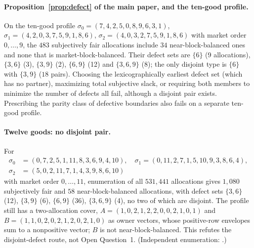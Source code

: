 \documentclass[11pt]{article}
\theoremstyle{definition}
\begin{document}
\paragraph{Proposition~\ref{prop:defect} of the main paper, and the ten-good profile.}
On the ten-good profile $\sigma_0=(7,4,2,5,0,8,9,6,3,1)$, $\sigma_1=(4,2,0,3,7,5,9,1,8,6)$, $\sigma_2=(4,0,3,2,7,5,9,1,8,6)$ with market order $0,\dots,9$, the $483$ subjectively fair allocations include $34$ near-block-balanced ones and none that is market-block-balanced. Their defect sets are $\{6\}$ (9 allocations), $\{3,6\}$ (3), $\{3,9\}$ (2), $\{6,9\}$ (12) and $\{3,6,9\}$ (8); the only disjoint type is $\{6\}$ with $\{3,9\}$ ($18$ pairs). Choosing the lexicographically earliest defect set (which has no partner), maximizing total subjective slack, or requiring both members to minimize the number of defects all fail, although a disjoint pair exists. Prescribing the parity class of defective boundaries also fails on a separate ten-good profile.

\paragraph{Twelve goods: no disjoint pair.}
For
\begin{align*}
\sigma_0&=(0,7,2,5,1,11,8,3,6,9,4,10),\quad
\sigma_1=(0,11,2,7,1,5,10,9,3,8,6,4),\\
\sigma_2&=(5,0,2,11,7,1,4,3,9,8,6,10)
\end{align*}
with market order $0,\dots,11$, enumeration of all $531{,}441$ allocations gives $1{,}080$ subjectively fair and $58$ near-block-balanced allocations, with defect sets $\{3,6\}$ (12), $\{3,9\}$ (6), $\{6,9\}$ (36), $\{3,6,9\}$ (4), no two of which are disjoint. The profile still has a two-allocation cover, $A=(1,0,2,1,2,2,0,0,2,1,0,1)$ and $B=(1,1,0,2,0,2,1,2,0,2,1,0)$ as owner vectors, whose positive-row envelopes sum to a nonpositive vector; $B$ is not near-block-balanced. This refutes the disjoint-defect route, not Open Question~1. (Independent enumeration: .)
\end{document}
